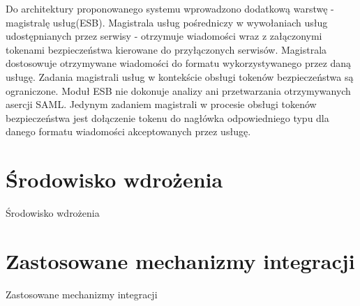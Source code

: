 		Do architektury proponowanego systemu wprowadzono dodatkową warstwę - magistralę usług(ESB). Magistrala usług pośredniczy w wywołaniach usług udostępnianych przez serwisy - otrzymuje wiadomości wraz z załączonymi tokenami bezpieczeństwa kierowane do przyłączonych serwisów. Magistrala dostosowuje otrzymywane wiadomości do formatu wykorzystywanego przez daną usługę. Zadania magistrali usług w kontekście obsługi tokenów bezpieczeństwa są ograniczone. Moduł ESB nie dokonuje analizy ani przetwarzania otrzymywanych asercji SAML. Jedynym zadaniem magistrali w procesie obsługi tokenów bezpieczeństwa jest dołączenie tokenu do nagłówka odpowiedniego typu dla danego formatu wiadomości akceptowanych przez usługę.
		

\section{Środowisko wdrożenia}
\label{sec:srodowiskoWdrozenia}

Środowisko wdrożenia


\section{Zastosowane mechanizmy integracji}
\label{sec:integracja}

Zastosowane mechanizmy integracji

